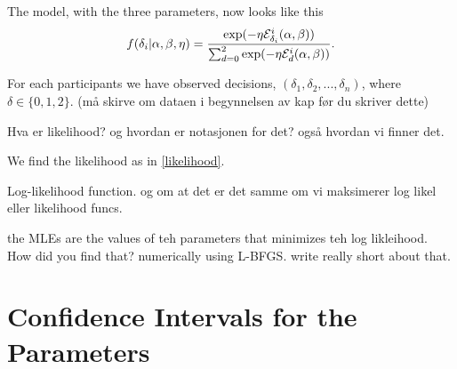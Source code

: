The model, with the three parameters, now looks like this
\begin{equation}
\label{softmax_real}
    f(\delta_{i}|\alpha, \beta,\eta) = \frac{\text{exp}(- \eta \mathcal{E}^i_{\delta_{i}}(\alpha, \beta))}{\sum_{d=0}^{2} \text{exp}(-\eta \mathcal{E}^i_{d}(\alpha, \beta))}. 
\end{equation}

For each participants we have observed decisions, $(\delta_1,\delta_2,...,\delta_n)$, where $\delta \in \{0,1,2 \}$. (må skirve om dataen i begynnelsen av kap før du skriver dette)

Hva er likelihood? og hvordan er notasjonen for det? også hvordan vi finner det. 

We find the likelihood as in \eqref{likelihood}. 


Log-likelihood function. og om at det er det samme om vi maksimerer log likel eller likelihood funcs. 

the MLEs are the values of teh parameters that minimizes teh log likleihood. How did you find that? numerically using L-BFGS. write really short about that. 


\section{Confidence Intervals for the Parameters}